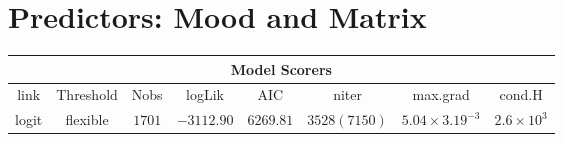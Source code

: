 \section{Predictors: Mood and Matrix}
\begin{minipage}{\linewidth}
\begin{tabular}{|c|c|c|c|c|c|c|c|}
\hline
\multicolumn{8}{|c|}{Model Scorers}\\\hline
link  &  Threshold & Nobs & logLik & AIC & niter & max.grad & cond.H\\\hline
logit & flexible & $1701$ & $-3112.90$ & $6269.81$ & $3528(7150)$ & $5.04\times 3.19^{-3}$ & $2.6\times 10^{3}$\\\hline
\end{tabular}
\end{minipage}
\newline
\newline
\newline
